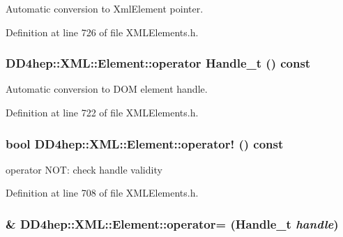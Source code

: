 Automatic conversion to XmlElement pointer. 

Definition at line 726 of file XMLElements.h.\hypertarget{class_d_d4hep_1_1_x_m_l_1_1_element_a5405403ccb2937db7dfbaed08cc33880}{
\subsubsection[{operator Handle\_\-t}]{\setlength{\rightskip}{0pt plus 5cm}DD4hep::XML::Element::operator {\bf Handle\_\-t} () const}}
\label{class_d_d4hep_1_1_x_m_l_1_1_element_a5405403ccb2937db7dfbaed08cc33880}


Automatic conversion to DOM element handle. 

Definition at line 722 of file XMLElements.h.\hypertarget{class_d_d4hep_1_1_x_m_l_1_1_element_a56049925440ca21e8f1fcb450cdd889f}{
\subsubsection[{operator!}]{\setlength{\rightskip}{0pt plus 5cm}bool DD4hep::XML::Element::operator! () const}}
\label{class_d_d4hep_1_1_x_m_l_1_1_element_a56049925440ca21e8f1fcb450cdd889f}


operator NOT: check handle validity 

Definition at line 708 of file XMLElements.h.\hypertarget{class_d_d4hep_1_1_x_m_l_1_1_element_a223f10555b456157ff26eb457a9e40e5}{
\subsubsection[{operator=}]{\& DD4hep::XML::Element::operator= ({\bf Handle\_\-t} {\em handle})}}
\label{class_d_d4hep_1_1_x_m_l_1_1_element_a223f10555b456157ff26eb457a9e40e5}


